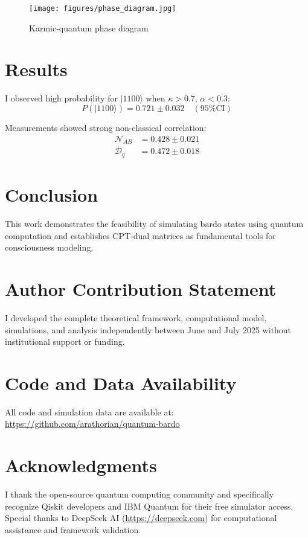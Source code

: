 \documentclass[12pt]{article}
\begin{document}
\begin{figure}[h]
\centering
\texttt{[image: figures/phase\_diagram.jpg]}
\caption{Karmic-quantum phase diagram}
\label{fig:phases}
\end{figure}

\section{Results}
I observed high probability for $|1100\rangle$ when $\kappa > 0.7$, $\alpha < 0.3$:
\begin{equation}
P(|1100\rangle) = 0.721 \pm 0.032 \quad (\text{95\% CI})
\end{equation}

Measurements showed strong non-classical correlation:
\begin{align*}
\mathcal{N}_{AB} &= 0.428 \pm 0.021 \\
\mathcal{D}_q &= 0.472 \pm 0.018
\end{align*}

\section{Conclusion}
This work demonstrates the feasibility of simulating bardo states using quantum computation and establishes CPT-dual matrices as fundamental tools for consciousness modeling.

\printbibliography[title=References]

\section*{Author Contribution Statement}
I developed the complete theoretical framework, computational model, simulations, and analysis independently between June and July 2025 without institutional support or funding.

\section*{Code and Data Availability}
All code and simulation data are available at: \url{https://github.com/arathorian/quantum-bardo}

\section*{Acknowledgments}
I thank the open-source quantum computing community and specifically recognize Qiskit developers and IBM Quantum for their free simulator access. Special thanks to DeepSeek AI (\url{https://deepseek.com}) for computational assistance and framework validation.
\end{document}
